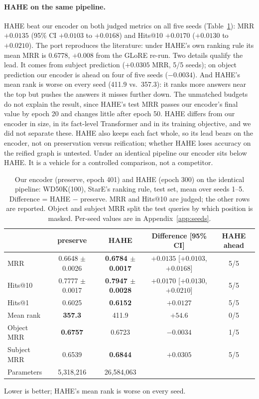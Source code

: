 \documentclass[11pt,a4paper]{article}
\newcommand{\hyper}{\textsf{preserve}}
\begin{document}
\paragraph{HAHE on the same pipeline.}
HAHE beat our encoder on both judged metrics on all five seeds (Table~\ref{tab:hahe}): MRR $+0.0135$ (95\% CI $+0.0103$ to $+0.0168$) and Hits@10 $+0.0170$ ($+0.0130$ to $+0.0210$). The port reproduces the literature: under HAHE's own ranking rule its mean MRR is 0.6778, $+0.008$ from the GLoRE re-run. Two details qualify the lead. It comes from subject prediction ($+0.0305$ MRR, 5/5 seeds); on object prediction our encoder is ahead on four of five seeds ($-0.0034$). And HAHE's mean rank is worse on every seed (411.9 vs.\ 357.3): it ranks more answers near the top but pushes the answers it misses further down. The unmatched budgets do not explain the result, since HAHE's test MRR passes our encoder's final value by epoch 20 and changes little after epoch 50. HAHE differs from our encoder in size, in its fact-level Transformer and in its training objective, and we did not separate these. HAHE also keeps each fact whole, so its lead bears on the encoder, not on preservation versus reification; whether HAHE loses accuracy on the reified graph is untested. Under an identical pipeline our encoder sits below HAHE. It is a vehicle for a controlled comparison, not a competitor.

\begin{table}[t]
\centering
\small
\begin{threeparttable}
\caption{Our encoder (\hyper, epoch 401) and HAHE (epoch 300) on the identical pipeline: WD50K(100), StarE's ranking rule, test set, mean over seeds 1--5. Difference = HAHE $-$ \hyper. MRR and Hits@10 are judged; the other rows are reported. Object and subject MRR split the test queries by which position is masked. Per-seed values are in Appendix~\ref{app:seeds}.}
\label{tab:hahe}
\begin{tabular}{@{}lcccc@{}}
\toprule
 & \hyper & HAHE & Difference [95\% CI] & HAHE ahead \\
\midrule
MRR & 0.6648 $\pm$ 0.0026 & \textbf{0.6784 $\pm$ 0.0017} & $+0.0135$ [$+0.0103$, $+0.0168$] & 5/5 \\
Hits@10 & 0.7777 $\pm$ 0.0017 & \textbf{0.7947 $\pm$ 0.0028} & $+0.0170$ [$+0.0130$, $+0.0210$] & 5/5 \\
Hits@1 & 0.6025 & \textbf{0.6152} & $+0.0127$ & 5/5 \\
Mean rank\tnote{a} & \textbf{357.3} & 411.9 & $+54.6$ & 0/5 \\
\midrule
Object MRR & \textbf{0.6757} & 0.6723 & $-0.0034$ & 1/5 \\
Subject MRR & 0.6539 & \textbf{0.6844} & $+0.0305$ & 5/5 \\
\midrule
Parameters & 5,318,216 & 26,584,063 & & \\
\bottomrule
\end{tabular}
\begin{tablenotes}\footnotesize
\item[a] Lower is better; HAHE's mean rank is worse on every seed.
\end{tablenotes}
\end{threeparttable}
\end{table}
\end{document}
